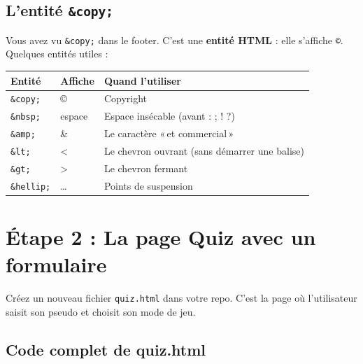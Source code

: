 \documentclass[11pt,a4paper]{article}
\begin{document}
\subsection{L'entité \texttt{\&copy;}}

Vous avez vu \texttt{\&copy;} dans le footer. C'est une \textbf{entité HTML} :
elle s'affiche \texttt{©}. Quelques entités utiles :

\begin{center}
\begin{tabular}{@{}lll@{}}
\toprule
\textbf{Entité} & \textbf{Affiche} & \textbf{Quand l'utiliser} \\
\midrule
\texttt{\&copy;}  & ©       & Copyright \\
\texttt{\&nbsp;}  & espace  & Espace insécable (avant : ; ! ?) \\
\texttt{\&amp;}   & \&      & Le caractère «\,et commercial\,» \\
\texttt{\&lt;}    & <       & Le chevron ouvrant (sans démarrer une balise) \\
\texttt{\&gt;}    & >       & Le chevron fermant \\
\texttt{\&hellip;} & \ldots & Points de suspension \\
\bottomrule
\end{tabular}
\end{center}

\newpage

\section{Étape 2 : La page Quiz avec un formulaire}

Créez un nouveau fichier \texttt{quiz.html} dans votre repo. C'est la page
où l'utilisateur saisit son pseudo et choisit son mode de jeu.

\subsection{Code complet de quiz.html}
\end{document}
